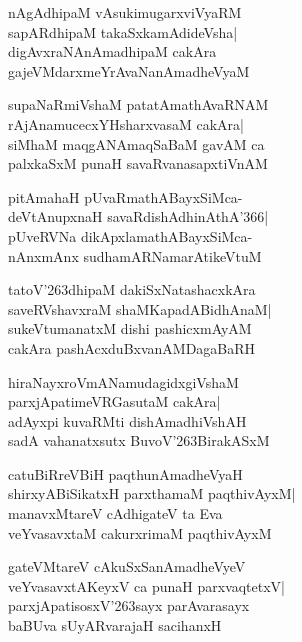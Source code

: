 \documentclass[twoside,12pt,openright]{book}
\def\S{\char'263}
\newcounter{shloka}[chapter]
\begin{document}
\begin{shloka}%
nAgAdhipaM vAsukimugarxviVyaRM\\
sapARdhipaM takaSxkamAdideVsha|\\
digAvxraNAnAmadhipaM cakAra\\
gajeVMdarxmeYrAvaNanAmadheVyaM
\end{shloka}

\begin{shloka}%
supaNaRmiVshaM patatAmathAvaRNAM\\
rAjAnamucecxYHsharxvasaM cakAra|\\
siMhaM maqgANAmaqSaBaM gavAM ca \\
palxkaSxM punaH savaRvanasapxtiVnAM
\end{shloka}

\begin{shloka}%
pitAmahaH pUvaRmathABayxSiMca-\\
deVtAnupxnaH savaRdishAdhinAthA\char'366|\\
pUveRVNa dikApxlamathABayxSiMca-\\
nAnxmAnx sudhamARNamarAtikeVtuM
\end{shloka}

\begin{shloka}%
tatoV\S dhipaM dakiSxNatashacxkAra\\
saveRVshavxraM shaMKapadABidhAnaM|\\
sukeVtumanatxM dishi pashicxmAyAM\\
cakAra pashAcxduBxvanAMDagaBaRH
\end{shloka}

\begin{shloka}%
hiraNayxroVmANamudagidxgiVshaM\\
parxjApatimeVRGasutaM cakAra|\\
adAyxpi kuvaRMti dishAmadhiVshAH\\
sadA vahanatxsutx BuvoV\S BirakASxM
\end{shloka}

\begin{shloka}%
catuBiRreVBiH paqthunAmadheVyaH\\
shirxyABiSikatxH parxthamaM paqthivAyxM|\\
manavxMtareV cAdhigateV ta Eva \\
veYvasavxtaM cakurxrimaM paqthivAyxM
\end{shloka}

\begin{shloka}%
gateVMtareV cAkuSxSanAmadheVyeV\\
veYvasavxtAKeyxV ca punaH parxvaqtetxV|\\
parxjApatisosxV\S sayx parAvarasayx\\
baBUva sUyARvarajaH sacihanxH
\end{shloka}
\end{document}
